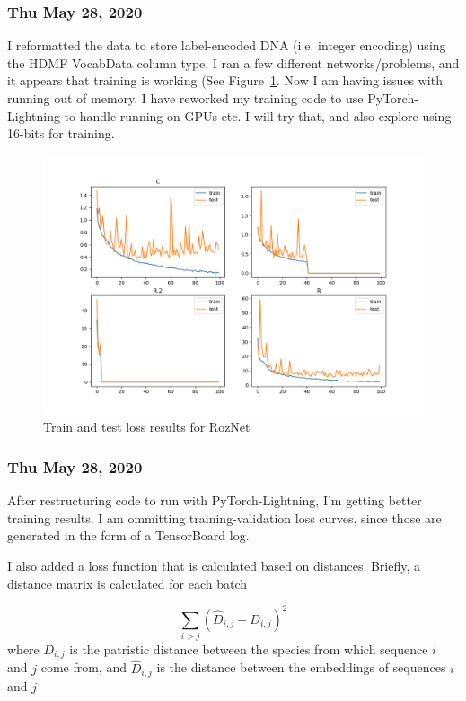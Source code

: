 \documentclass{article}
\begin{document}
\subsubsection*{Thu May 28, 2020}
I reformatted the data to store label-encoded DNA (i.e. integer encoding) using the HDMF VocabData column type. I ran
a few different networks/problems, and it appears that training is working (See Figure~\ref{fig:encoding_fix_results}. Now I am having issues with running out of
memory. I have reworked my training code to use PyTorch-Lightning to handle running on GPUs etc. I will try that, and 
also explore using 16-bits for training. 

\begin{figure}
  \includegraphics[width=\linewidth]{encoding_fix.results.png}
  \caption{Train and test loss results for RozNet}
  \label{fig:encoding_fix_results}
\end{figure}

\subsubsection*{Thu May 28, 2020}
After restructuring code to run with PyTorch-Lightning, I'm getting better training results. I am ommitting training-validation loss curves, since those are generated in the form of a TensorBoard log. 

I also added a loss function that is calculated based on distances. Briefly, a distance matrix is calculated for each batch

\begin{equation}
\sum_{i>j} (\widehat{D}_{i,j} - D_{i,j})^2
\end{equation}
where $D_{i,j}$ is the patristic distance between the species from which sequence $i$ and $j$ come from, and $\widehat{D}_{i,j}$ is the distance between the embeddings of sequences $i$ and $j$
\end{document}

